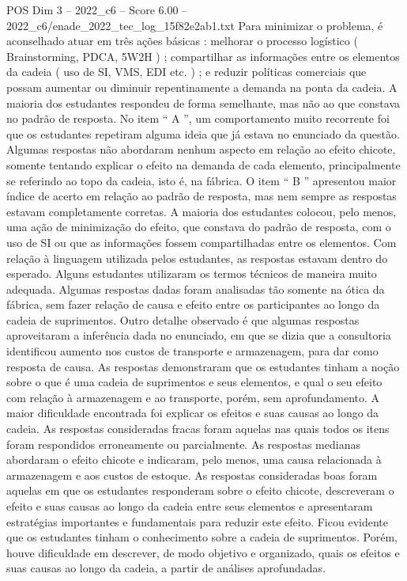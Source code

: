 \begin{textsample}{POS Dim 3 – 2022\_c6 – Score 6.00 – 2022\_c6/enade\_2022\_tec\_log\_15f82e2ab1.txt}
Para minimizar o problema, é aconselhado atuar em três ações básicas : melhorar o processo logístico ( Brainstorming, PDCA, 5W2H ) ; compartilhar as informações entre os elementos da cadeia ( uso de SI, VMS, EDI etc. ) ; e reduzir políticas comerciais que possam aumentar ou diminuir repentinamente a demanda na ponta da cadeia.
A maioria dos estudantes respondeu de forma semelhante, mas não ao que constava no padrão de resposta.
No item “ A ”, um comportamento muito recorrente foi que os estudantes repetiram alguma ideia que já estava no enunciado da questão.
Algumas respostas não abordaram nenhum aspecto em relação ao efeito chicote, somente tentando explicar o efeito na demanda de cada elemento, principalmente se referindo ao topo da cadeia, isto é, na fábrica.
O item “ B ” apresentou maior índice de acerto em relação ao padrão de resposta, mas nem sempre as respostas estavam completamente corretas.
A maioria dos estudantes colocou, pelo menos, uma ação de minimização do efeito, que constava do padrão de resposta, com o uso de SI ou que as informações fossem compartilhadas entre os elementos.
Com relação à linguagem utilizada pelos estudantes, as respostas estavam dentro do esperado.
Alguns estudantes utilizaram os termos técnicos de maneira muito adequada.
Algumas respostas dadas foram analisadas tão somente na ótica da fábrica, sem fazer relação de causa e efeito entre os participantes ao longo da cadeia de suprimentos.
Outro detalhe observado é que algumas respostas aproveitaram a inferência dada no enunciado, em que se dizia que a consultoria identificou aumento nos custos de transporte e armazenagem, para dar como resposta de causa.
As respostas demonstraram que os estudantes tinham a noção sobre o que é uma cadeia de suprimentos e seus elementos, e qual o seu efeito com relação à armazenagem e ao transporte, porém, sem aprofundamento.
A maior dificuldade encontrada foi explicar os efeitos e suas causas ao longo da cadeia.
As respostas consideradas fracas foram aquelas nas quais todos os itens foram respondidos erroneamente ou parcialmente.
As respostas medianas abordaram o efeito chicote e indicaram, pelo menos, uma causa relacionada à armazenagem e aos custos de estoque.
As respostas consideradas boas foram aquelas em que os estudantes responderam sobre o efeito chicote, descreveram o efeito e suas causas ao longo da cadeia entre seus elementos e apresentaram estratégias importantes e fundamentais para reduzir este efeito.
Ficou evidente que os estudantes tinham o conhecimento sobre a cadeia de suprimentos.
Porém, houve dificuldade em descrever, de modo objetivo e organizado, quais os efeitos e suas causas ao longo da cadeia, a partir de análises aprofundadas.

\end{textsample}

